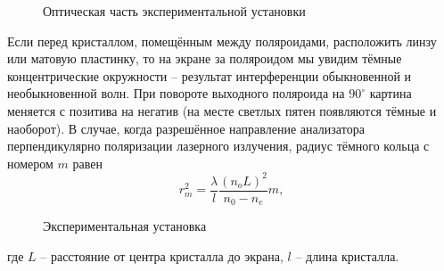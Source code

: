 \documentclass[a4paper,12pt]{article} %
\begin{document}
\begin{figure}[h]
  \caption{\centering Оптическая часть экспериментальной установки}
	\label{fig:image1}
\end{figure}

Если перед кристаллом, помещённым между поляроидами, расположить линзу или матовую пластинку, то на экране за поляроидом мы увидим тёмные концентрические окружности -- результат интерференции обыкновенной и необыкновенной волн. При повороте выходного поляроида на $90^\circ$ картина меняется с позитива на негатив (на месте светлых пятен появляются тёмные и наоборот). В случае, когда разрешённое направление анализатора перпендикулярно поляризации лазерного излучения, радиус тёмного кольца с номером $m$ равен
\begin{equation}
r_m^2 = \dfrac{\lambda}{l} \dfrac{(n_oL)^2}{n_0 - n_e}m,
\end{equation}

\begin{figure}[h]
 \caption{\centering Экспериментальная установка}
	\label{fig:image1}
\end{figure}

где $L$ -- расстояние от центра кристалла до экрана, $l$ -- длина кристалла.
\end{document}
